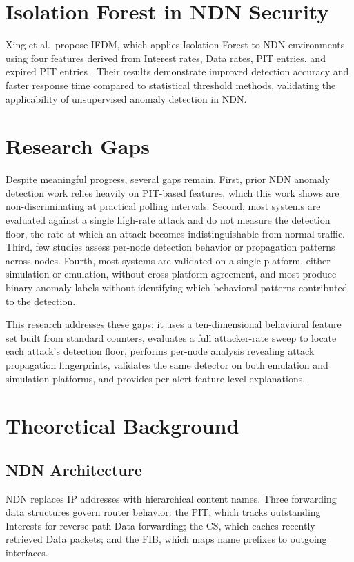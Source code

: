 \documentclass[12pt]{report}
\begin{document}
\section{Isolation Forest in NDN Security}

Xing et al.\ propose IFDM, which applies Isolation Forest to NDN environments using four features derived from Interest rates, Data rates, PIT entries, and expired PIT entries \cite{xing2021isolation}. Their results demonstrate improved detection accuracy and faster response time compared to statistical threshold methods, validating the applicability of unsupervised anomaly detection in NDN.

\section{Research Gaps}

Despite meaningful progress, several gaps remain. First, prior NDN anomaly detection work relies heavily on PIT-based features, which this work shows are non-discriminating at practical polling intervals. Second, most systems are evaluated against a single high-rate attack and do not measure the detection floor, the rate at which an attack becomes indistinguishable from normal traffic. Third, few studies assess per-node detection behavior or propagation patterns across nodes. Fourth, most systems are validated on a single platform, either simulation or emulation, without cross-platform agreement, and most produce binary anomaly labels without identifying which behavioral patterns contributed to the detection.

This research addresses these gaps: it uses a ten-dimensional behavioral feature set built from standard counters, evaluates a full attacker-rate sweep to locate each attack's detection floor, performs per-node analysis revealing attack propagation fingerprints, validates the same detector on both emulation and simulation platforms, and provides per-alert feature-level explanations.

\section{Theoretical Background}

\subsection{NDN Architecture}

NDN replaces IP addresses with hierarchical content names. Three forwarding data structures govern router behavior: the PIT, which tracks outstanding Interests for reverse-path Data forwarding; the CS, which caches recently retrieved Data packets; and the FIB, which maps name prefixes to outgoing interfaces.
\end{document}
